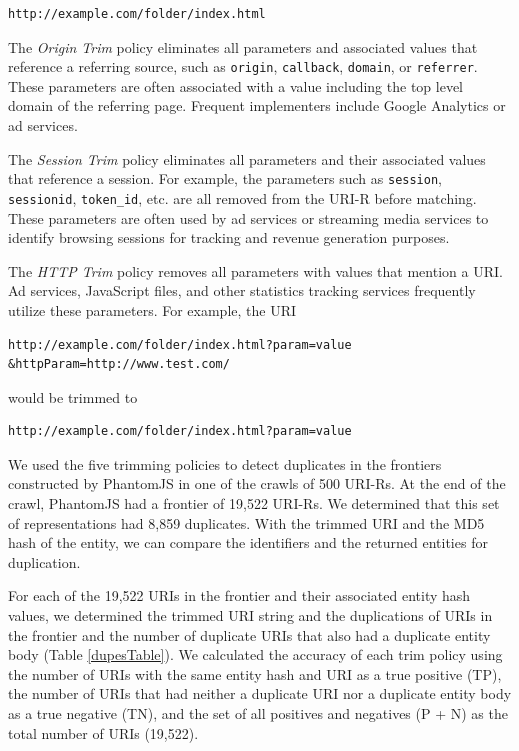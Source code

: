 \documentclass{ipres_proc_article-sp}
\begin{document}
\begin{verbatim}
http://example.com/folder/index.html
\end{verbatim} 


 
The \emph{Origin Trim} policy eliminates all parameters and associated values that reference a referring source, such as \texttt{origin}, \texttt{callback}, \texttt{domain}, or \texttt{referrer}. These parameters are often associated with a value including the top level domain of the referring page. Frequent implementers include Google Analytics or ad services.

The \emph{Session Trim} policy eliminates all parameters and their associated values that reference a session. 
For example, the parameters such as \texttt{session}, \texttt{sessionid}, \texttt{token\_id}, etc. are all removed from the URI-R before matching. These parameters are often used by ad services or streaming media services to identify browsing sessions for tracking and revenue generation purposes.

The \emph{HTTP Trim} policy removes all parameters with values that mention a URI. Ad services, JavaScript files, and other statistics tracking services frequently utilize these parameters. 
For example, the URI 

\begin{verbatim}
http://example.com/folder/index.html?param=value
&httpParam=http://www.test.com/
\end{verbatim}

\noindent would be trimmed to 
 
\begin{verbatim}
http://example.com/folder/index.html?param=value
\end{verbatim}
  

We used the five trimming policies to detect duplicates in the frontiers constructed by PhantomJS in one of the crawls of 500 URI-Rs. At the end of the crawl, PhantomJS had a frontier of 19,522 URI-Rs. We determined that this set of representations had 8,859 duplicates. With the trimmed URI and the MD5 hash of the entity, we can compare the identifiers and the returned entities for duplication. 


For each of the 19,522 URIs in the frontier and their associated entity hash values, we determined the trimmed URI string and the duplications of URIs in the frontier and the number of duplicate URIs that also had a duplicate entity body (Table \ref{dupesTable}). We calculated the accuracy of each trim policy using the number of URIs with the same entity hash and URI as a true positive (TP), the number of URIs that had neither a duplicate URI nor a duplicate entity body as a true negative (TN), and the set of all positives and negatives (P + N) as the total number of URIs (19,522). 
\end{document}
